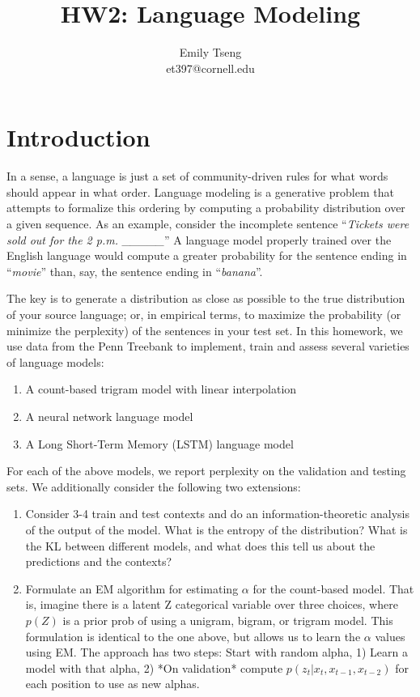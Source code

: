 \documentclass[11pt]{article}
\title{HW2: Language Modeling}
\author{Emily Tseng \\ et397@cornell.edu}
\begin{document}
\maketitle{}
\section{Introduction}

In a sense, a language is just a set of community-driven rules for what words should appear in what order. Language modeling is a generative problem that attempts to formalize this ordering by computing a probability distribution over a given sequence. As an example, consider the incomplete sentence ``\textit{Tickets were sold out for the 2 p.m. \_\_\_\_\_}'' A language model properly trained over the English language would compute a greater probability for the sentence ending in ``\textit{movie}'' than, say, the sentence ending in ``\textit{banana}''. 

The key is to generate a distribution as close as possible to the true distribution of your source language; or, in empirical terms, to maximize the probability (or minimize the perplexity) of the sentences in your test set. In this homework, we use data from the Penn Treebank \citep{marcus-etal-1993-building} to implement, train and assess several varieties of language models:

\begin{enumerate}
  \item A count-based trigram model with linear interpolation
  \item A neural network language model \citep{bengio2003neural}
  \item A Long Short-Term Memory (LSTM) language model \citep{zaremba2014recurrent}
\end{enumerate}

For each of the above models, we report perplexity on the validation and testing sets. We additionally consider the following two extensions:

\begin{enumerate}
  \item Consider 3-4 train and test contexts and do an information-theoretic analysis of the output of the model. What is the entropy of the distribution? What is the KL between different models, and what does this tell us about the predictions and the contexts?
  \item Formulate an EM algorithm for estimating $\alpha$ for the count-based model. That is, imagine there is a latent Z categorical variable over three choices, where $p(Z)$ is a prior prob of using a unigram, bigram, or trigram model. This formulation is identical to the one above, but allows us to learn the $\alpha$ values using EM. The approach has two steps: Start with random alpha, 1) Learn a model with that alpha, 2) *On validation* compute $p(z_t | x_t, x_{t-1}, x_{t-2})$ for each position to use as new alphas. 
\end{enumerate}
\end{document}
